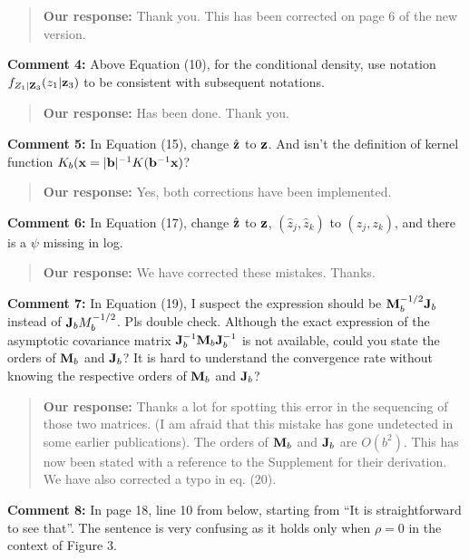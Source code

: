 \documentclass[
  12pt,
  letterpaper]{article}
\numberwithin{equation}{section}
\begin{document}
\begin{quote}
\textbf{Our response:} Thank you. This has been corrected on page 6 of the new version.
\end{quote}

\textbf{Comment 4:} Above Equation (10), for the conditional density, use notation \(f_{Z_1|{\bf Z}_3}(z_1|{\bf z}_3)\) to be consistent with subsequent notations.

\begin{quote}
\textbf{Our response:} Has been done. Thank you.
\end{quote}

\textbf{Comment 5:} In Equation (15), change \(\hat{\bf z}\) to \({\bf z}\). And isn't the definition of kernel function \(K_b({\bf x} = |{\bf b}|^{-1}K({\bf b}^{-1}{\bf x})\)?

\begin{quote}
\textbf{Our response:} Yes, both corrections have been implemented.
\end{quote}

\textbf{Comment 6:} In Equation (17), change \(\hat{\bf z}\) to \({\bf z}\), \((\hat{z}_j,\hat{z}_k)\) to \((z_j,z_k)\), and there is a \(\psi\) missing in log.

\begin{quote}
\textbf{Our response:} We have corrected these mistakes. Thanks.
\end{quote}

\textbf{Comment 7:} In Equation (19), I suspect the expression should be \({\bf M}_b^{-1/2}{\bf J}_b\) instead of \({\bf J}_{b}M_{b}^{-1/2}\). Pls double check. Although the exact expression of the asymptotic covariance matrix \({\bf J}_b^{-1}{\bf M}_b{\bf J}_b^{-1}\) is not available, could you state the orders of \({\bf M}_b\) and \({\bf J}_b\)? It is hard to understand the convergence rate without knowing the respective orders of \({\bf M}_b\) and \({\bf J}_b\)?

\begin{quote}
\textbf{Our response:} Thanks a lot for spotting this error in the sequencing of those two matrices. (I am afraid that this mistake has gone undetected in some earlier publications). The orders of \({\bf M}_b\) and \({\bf J}_b\) are \(O(b^2)\). This has now been stated with a reference to the Supplement for their derivation. We have also corrected a typo in eq. (20).
\end{quote}

\textbf{Comment 8:} In page 18, line 10 from below, starting from ``It is straightforward to see that''. The sentence is very confusing as it holds only when \(\rho = 0\) in the context of Figure 3.
\end{document}
